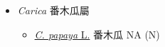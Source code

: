 
  \begin{itemize}
 \item[] \textit{Carica} 番木瓜屬
                                
  \begin{itemize}
        \item[] \href{http://www.theplantlist.org/tpl1.1/search?q=Carica+papaya}{\textit{C. papaya} L.}   番木瓜   NA (N)
  \end{itemize}
  \end{itemize}
